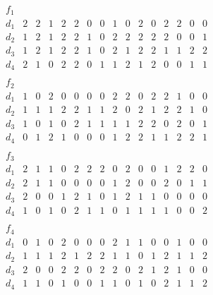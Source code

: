 $$\begin{array}{c|ccccccccccccccc} 
f_1 &&&&&&&&&&&&&&&\\ 
\hline 
d_1 & 2& 2& 1& 2& 2& 0& 0& 1& 0& 2& 0& 2& 2& 0& 0\\ 
d_2 & 1& 2& 1& 2& 2& 1& 0& 2& 2& 2& 2& 2& 0& 0& 1\\ 
d_3 & 1& 2& 1& 2& 2& 1& 0& 2& 1& 2& 2& 1& 1& 2& 2\\ 
d_4 & 2& 1& 0& 2& 2& 0& 1& 1& 2& 1& 2& 0& 0& 1& 1\\ 
\end{array}$$ 
$$\begin{array}{c|ccccccccccccccc} 
f_2 &&&&&&&&&&&&&&&\\ 
\hline 
d_1 & 1& 0& 2& 0& 0& 0& 0& 2& 2& 0& 2& 2& 1& 0& 0\\ 
d_2 & 1& 1& 1& 2& 2& 1& 1& 2& 0& 2& 1& 2& 2& 1& 0\\ 
d_3 & 1& 0& 1& 0& 2& 1& 1& 1& 1& 2& 2& 0& 2& 0& 1\\ 
d_4 & 0& 1& 2& 1& 0& 0& 0& 1& 2& 2& 1& 1& 2& 2& 1\\ 
\end{array}$$ 
$$\begin{array}{c|ccccccccccccccc} 
f_3 &&&&&&&&&&&&&&&\\ 
\hline 
d_1 & 2& 1& 1& 0& 2& 2& 2& 0& 2& 0& 0& 1& 2& 2& 0\\ 
d_2 & 2& 1& 1& 0& 0& 0& 0& 1& 2& 0& 0& 2& 0& 1& 1\\ 
d_3 & 2& 0& 0& 1& 2& 1& 0& 1& 2& 1& 1& 0& 0& 0& 0\\ 
d_4 & 1& 0& 1& 0& 2& 1& 1& 0& 1& 1& 1& 1& 0& 0& 2\\ 
\end{array}$$ 
$$\begin{array}{c|ccccccccccccccc} 
f_4 &&&&&&&&&&&&&&&\\ 
\hline 
d_1 & 0& 1& 0& 2& 0& 0& 0& 2& 1& 1& 0& 0& 1& 0& 0\\ 
d_2 & 1& 1& 1& 2& 1& 2& 2& 1& 1& 0& 1& 2& 1& 1& 2\\ 
d_3 & 2& 0& 0& 2& 2& 0& 2& 2& 0& 2& 1& 2& 1& 0& 0\\ 
d_4 & 1& 1& 0& 1& 0& 0& 1& 1& 0& 1& 0& 2& 1& 1& 2\\ 
\end{array}$$ 
